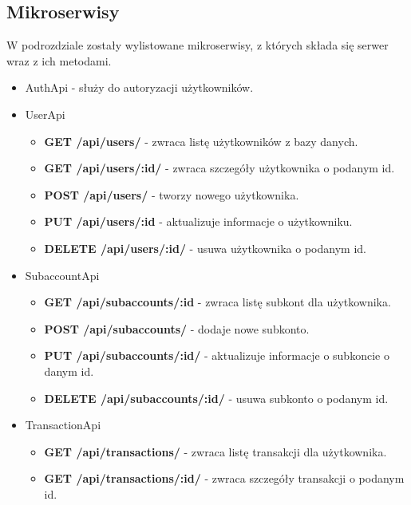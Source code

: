 \documentclass{article}
\begin{document}
	\subsection{Mikroserwisy}
	W podrozdziale zostały wylistowane mikroserwisy, z których składa się serwer wraz z ich 
	metodami.
	\begin{itemize}
		\item AuthApi - służy do autoryzacji użytkowników.
		\item UserApi
			\begin{itemize}
				\item \textbf{GET /api/users/} - zwraca listę użytkowników z bazy danych.
				
				\item \textbf{GET /api/users/:id/} - zwraca szczegóły użytkownika o podanym id.
				
				\item \textbf{POST /api/users/} - tworzy nowego użytkownika.
				
				\item \textbf{PUT /api/users/:id} - aktualizuje informacje o użytkowniku.
				
				\item \textbf{DELETE /api/users/:id/} - usuwa użytkownika o podanym id.
				
			\end{itemize}
		\item SubaccountApi
			\begin{itemize}
				\item \textbf{GET /api/subaccounts/:id} - zwraca listę subkont dla użytkownika.
				
				\item \textbf{POST /api/subaccounts/} - dodaje nowe subkonto.
				
				\item \textbf{PUT /api/subaccounts/:id/} - aktualizuje informacje o subkoncie o danym id.
				
				\item \textbf{DELETE /api/subaccounts/:id/} - usuwa subkonto o podanym id.
			\end{itemize}
		\item TransactionApi
			\begin{itemize}
				\item \textbf{GET /api/transactions/} - zwraca listę transakcji dla użytkownika.
				
				\item \textbf{GET /api/transactions/:id/} - zwraca szczegóły transakcji o podanym id.
				

\end{itemize}
\end{itemize}
\end{document}
